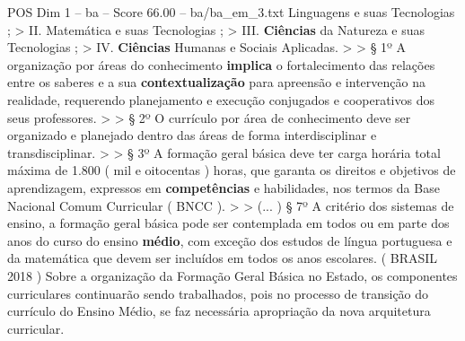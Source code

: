 \begin{textsample}{POS Dim 1 – ba – Score 66.00 – ba/ba\_em\_3.txt}
Linguagens e suas Tecnologias ; > II.
Matemática e suas Tecnologias ; > III. \textbf{Ciências} da Natureza e suas Tecnologias ; > IV. \textbf{Ciências} Humanas e Sociais Aplicadas. > > § 1º A organização por áreas do conhecimento \textbf{implica} o fortalecimento das relações entre os saberes e a sua \textbf{contextualização} para apreensão e intervenção na realidade, requerendo planejamento e execução conjugados e cooperativos dos seus professores. > > § 2º O currículo por área de conhecimento deve ser organizado e planejado dentro das áreas de forma interdisciplinar e transdisciplinar. > > § 3º A formação geral básica deve ter carga horária total máxima de 1.800 ( mil e oitocentas ) horas, que garanta os direitos e objetivos de aprendizagem, expressos em \textbf{competências} e habilidades, nos termos da Base Nacional Comum Curricular ( BNCC ). > > (... ) § 7º A critério dos sistemas de ensino, a formação geral básica pode ser contemplada em todos ou em parte dos anos do curso do ensino \textbf{médio}, com exceção dos estudos de língua portuguesa e da matemática que devem ser incluídos em todos os anos escolares. ( BRASIL 2018 ) Sobre a organização da Formação Geral Básica no Estado, os componentes curriculares continuarão sendo trabalhados, pois no processo de transição do currículo do Ensino Médio, se faz necessária apropriação da nova arquitetura curricular.

\end{textsample}
